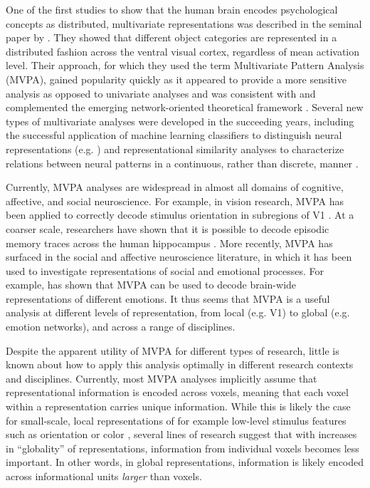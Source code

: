 \documentclass[12pt,a4paper]{article}\usepackage[]{graphicx}\usepackage[]{color}
\begin{document}
One of the first studies to show that the human brain encodes psychological concepts as distributed, multivariate representations was described in the seminal paper by \cite{haxby2001}. They showed that different object categories are represented in a distributed fashion across the ventral visual cortex, regardless of mean activation level. Their approach, for which they used the term Multivariate Pattern Analysis (MVPA), gained popularity quickly as it appeared to provide a more sensitive analysis as opposed to univariate analyses \citep{norman2006,mahmoudi2012} and was consistent with and complemented the emerging network-oriented theoretical framework \citep{bressler2010}. Several new types of multivariate analyses were developed in the succeeding years, including the successful application of machine learning classifiers to distinguish neural representations (e.g. \citealp{cox2003}) and representational similarity analyses to characterize relations between neural patterns in a continuous, rather than discrete, manner \citep{kriegeskorte2008}. 

Currently, MVPA analyses are widespread in almost all domains of cognitive, affective, and social neuroscience. For example, in vision research, MVPA has been applied to correctly decode stimulus orientation in subregions of V1 \citep{kamitani2005}. At a coarser scale, researchers have shown that it is possible to decode episodic memory traces across the human hippocampus \citep{chadwick2010}. More recently, MVPA has surfaced in the social and affective neuroscience literature, in which it has been used to investigate representations of social and emotional processes. For example, \cite{kassam2013} has shown that MVPA can be used to decode brain-wide representations of different emotions. It thus seems that MVPA is a useful analysis at different levels of representation, from local (e.g. V1) to global (e.g. emotion networks), and across a range of disciplines.     

Despite the apparent utility of MVPA for different types of research, little is known about how to apply this analysis optimally in different research contexts and disciplines. Currently, most MVPA analyses implicitly assume that representational information is encoded across voxels, meaning that each voxel within a representation carries unique information. While this is likely the case for small-scale, local representations of for example low-level stimulus features such as orientation \citep{kamitani2005} or color \citep{brouwer2009}, several lines of research suggest that with increases in ``globality'' of representations, information from individual voxels becomes less important. In other words, in global representations, information is likely encoded across informational units \emph{larger} than voxels. 
\end{document}

